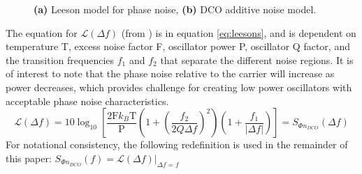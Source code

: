 	\begin{figure}[htb!]
	    \centering
	    \begin{subfigure}{0.45\textwidth}
	        \centering
			
			\caption{ }
			\label{fig:leeson_pn}
	    \end{subfigure}
	    \begin{subfigure}{0.5\textwidth}
	        \centering
			
			\caption{ }
			\label{fig:dco_noise}
	    \end{subfigure}%
	    \label{fig:osc_pn_figs}
	    \caption{\textbf{(a)} Leeson model for phase noise, \textbf{(b)} DCO additive noise model.}
	\end{figure}
	\FloatBarrier
	The equation for $\mathcal{L}(\Delta f)$ (from \cite{lee_hajimiri_2000}) is in equation \ref{eq:leesons}, and is dependent on temperature T, excess noise factor F, oscillator power P, oscillator Q factor, and the transition frequencies $f_1$ and $f_2$ that separate the different noise regions. It is of interest to note that the phase noise relative to the carrier will increase as power decreases, which provides challenge for creating low power oscillators with acceptable phase noise characteristics.
	\begin{equation}\label{eq:leesons}
	\mathcal{L}(\Delta f) = 10\log_{10}\left[\frac{2\text{F}k_B\text{T}}{\text{P}}\left(1+\left(\frac{f_2}{2Q\Delta f}\right)^2\right)\left(1+\frac{f_1}{|\Delta f|}\right)\right] = S_{\Phi n_{DCO}}(\Delta f)
	\end{equation}
	For notational consistency, the following redefinition is used in the remainder of this paper: $S_{\Phi n_{DCO}}(f) = \mathcal{L}(\Delta f)|_{\Delta f = f}$

